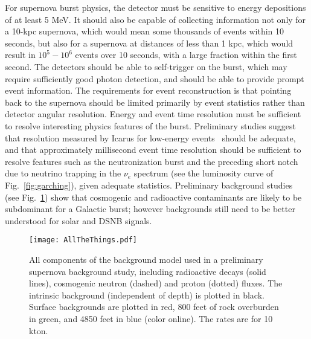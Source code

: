 For supernova burst physics, the detector must be sensitive to energy depositions of at least 5 MeV.  It should also be capable of collecting information not only for a 10-kpc supernova, which would mean some thousands of events within 10 seconds, but also for a supernova at distances of less than 1 kpc, which would result in $10^5-10^6$  events over 10 seconds, with a large fraction within the first second.    The detectors should be able to self-trigger on the burst, which may require sufficiently good photon detection, and should be able to provide prompt event information. 
The requirements for event reconstruction is that pointing back to the supernova should be limited primarily by event statistics rather than detector angular resolution.
Energy and event time resolution must be sufficient to resolve interesting physics features of the burst.  Preliminary studies suggest that resolution measured by Icarus for low-energy events~\cite{Amoruso:2003sw} should be adequate, and that approximately millisecond event time resolution should be sufficient to resolve features such as the neutronization burst and the preceding short notch due to neutrino trapping in the $\nu_e$ spectrum (see the luminosity curve of Fig.~\ref{fig:garching}), given adequate statistics.   Preliminary background studies (see Fig.~\ref{fig:vicbg}) show that cosmogenic and radioactive contaminants are likely to be subdominant for a Galactic burst; however backgrounds still need to be better understood for solar and DSNB signals.

\begin{figure}[htbp]
\begin{center}
\texttt{[image: AllTheThings.pdf]}
\caption{
All components of the background model used in a preliminary supernova background study, including radioactive decays (solid lines), cosmogenic neutron (dashed) and proton (dotted) fluxes.  The intrinsic background (independent of depth) is plotted in black.  Surface backgrounds are plotted in red, 800 feet of rock overburden in green, and 4850 feet in blue (color online). The rates are for 10 kton. } 
\label{fig:vicbg}
\end{center}
\end{figure}



